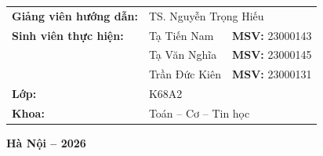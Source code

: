 \begin{titlepage}
\begin{center}
  \vspace{0.9cm}

  \begin{tabular}{p{4.5cm}ll}
    \textbf{Giảng viên hướng dẫn:} & \multicolumn{2}{l}{TS. Nguyễn Trọng Hiếu} \\[0.3cm]
    \textbf{Sinh viên thực hiện:}  & Tạ Tiến Nam   & \textbf{MSV:} 23000143 \\
                                   & Tạ Văn Nghĩa  & \textbf{MSV:} 23000145 \\
                                   & Trần Đức Kiên & \textbf{MSV:} 23000131 \\[0.3cm]
    \textbf{Lớp:}                  & \multicolumn{2}{l}{K68A2} \\
    \textbf{Khoa:}                 & \multicolumn{2}{l}{Toán -- Cơ -- Tin học} \\
  \end{tabular}

  \vfill
  {\large \textbf{Hà Nội -- 2026}}
\end{center}
\end{titlepage}

